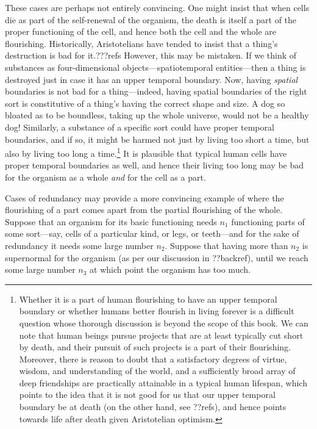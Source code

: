 These cases are perhaps not entirely convincing. One might insist that when cells die as part of the self-renewal
of the organism, the death is itself a part of the proper functioning of the cell, and hence both the cell and the
whole are flourishing. Historically, Aristotelians have tended to insist that a thing's destruction is bad
for it.???refs However, this may be mistaken. If we think of substances as four-dimensional objects---spatiotemporal
entities---then a thing is destroyed just in case it has an upper temporal boundary. Now, having \textit{spatial} 
boundaries is not bad for a thing---indeed, having spatial boundaries of the right sort is constitutive of a thing's
having the correct shape and size. A dog so bloated as to be boundless, taking up the whole universe, would not be a 
healthy dog! Similarly, a substance of a specific sort could have proper temporal boundaries, and if so, it might be harmed not just by
living too short a time, but also by living too long a time.\footnote{
Whether it is a part of human flourishing to have an upper temporal boundary or whether humans better flourish
in living forever is a difficult
question whose thorough discussion is beyond the scope of this book. We can note that human beings 
pursue projects that  are at least typically cut short by death, and their pursuit of such projects 
is a part of their flourishing. Moreover, there is reason to doubt that a satisfactory degrees of virtue, wisdom, 
and understanding of the world, and a sufficiently broad array of deep friendships are practically 
attainable in a typical human lifespan, which points to the idea that it is not good for us that our upper
temporal boundary be at death (on the
other hand, see ??refs), and hence points towards life after death given Aristotelian optimism.} It is plausible that typical human cells have 
proper temporal boundaries as well, and hence their living too long may be bad for the organism as a whole
\textit{and} for the cell as a part.

Cases of redundancy may provide a more convincing example of where the flourishing of a part comes apart from
the partial flourishing of the whole. Suppose that an organism for its basic functioning needs $n_1$ functioning parts of some sort---say,
cells of a particular kind, or legs, or teeth---and for the sake of redundancy it needs some large number $n_2$.
Suppose that having more than $n_2$ is supernormal for the organism (as per our discussion in ??backref), until we
reach some large number $n_3$ at which point the organism has too much.  

